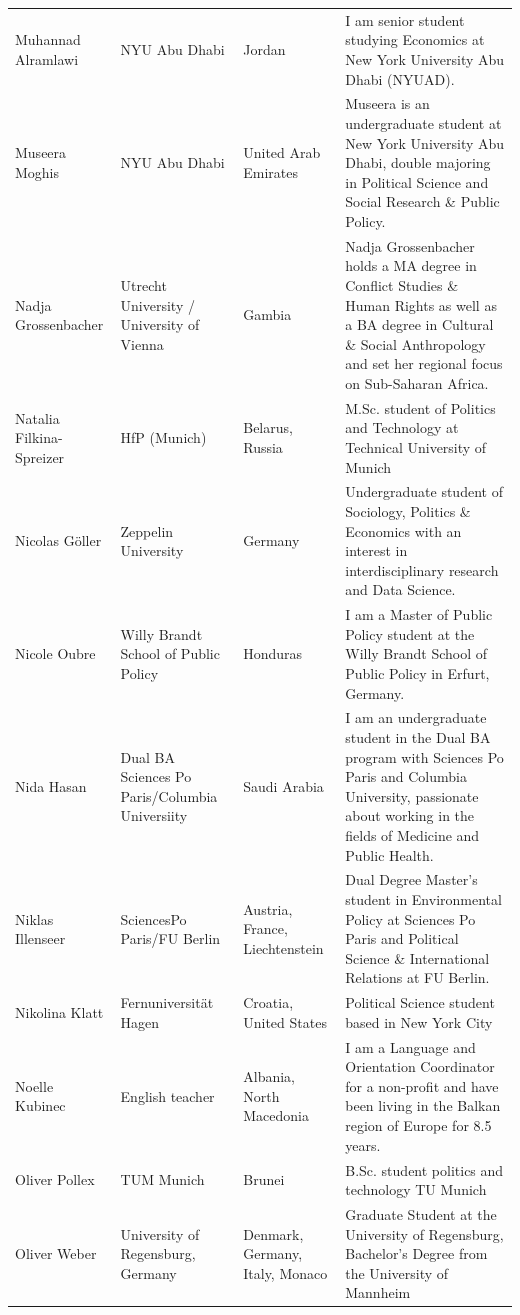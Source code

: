 \documentclass[]{article}
\begin{document}
\begin{longtable}{l>{\raggedright\arraybackslash}p{2cm}>{\raggedright\arraybackslash}p{2cm}>{\raggedright\arraybackslash}p{3cm}}
\rowcolor{gray!6}  Muhannad Alramlawi & NYU Abu Dhabi & Jordan & I am senior student studying Economics at New York University Abu Dhabi (NYUAD).\\
Museera Moghis & NYU Abu Dhabi & United Arab Emirates & Museera is an undergraduate student at New York University Abu Dhabi, double majoring in Political Science and Social Research \& Public Policy.\\
\rowcolor{gray!6}  Nadja Grossenbacher & Utrecht University / University of Vienna & Gambia & Nadja Grossenbacher holds a MA degree in Conflict Studies \& Human Rights as well as a BA degree in Cultural \& Social Anthropology and set her regional focus on Sub-Saharan Africa.\\
Natalia Filkina-Spreizer & HfP (Munich) & Belarus, Russia & M.Sc. student of Politics and Technology at Technical University of Munich\\
\rowcolor{gray!6}  Nicolas Göller & Zeppelin University & Germany & Undergraduate student of Sociology, Politics \& Economics with an interest in interdisciplinary research and Data Science.\\
\addlinespace
Nicole Oubre & Willy Brandt School of Public Policy & Honduras & I am a Master of Public Policy student at the Willy Brandt School of Public Policy in Erfurt, Germany.\\
\rowcolor{gray!6}  Nida Hasan & Dual BA Sciences Po Paris/Columbia Universiity & Saudi Arabia & I am an undergraduate student in the Dual BA program with Sciences Po Paris and Columbia University, passionate about working in the fields of Medicine and Public Health.\\
Niklas Illenseer & SciencesPo Paris/FU Berlin & Austria, France, Liechtenstein & Dual Degree Master's student in Environmental Policy at Sciences Po Paris and Political Science \& International Relations at FU Berlin.\\
\rowcolor{gray!6}  Nikolina Klatt & Fernuniversität Hagen & Croatia, United States & Political Science student based in New York City\\
Noelle Kubinec & English teacher & Albania, North Macedonia & I am a Language and Orientation Coordinator for a non-profit and have been living in the Balkan region of Europe for 8.5 years.\\
\addlinespace
\rowcolor{gray!6}  Oliver Pollex & TUM Munich & Brunei & B.Sc. student politics and technology TU Munich\\
Oliver Weber & University of Regensburg, Germany & Denmark, Germany, Italy, Monaco & Graduate Student at the University of Regensburg, Bachelor's Degree from the University of Mannheim\\

\end{longtable}
\end{document}
